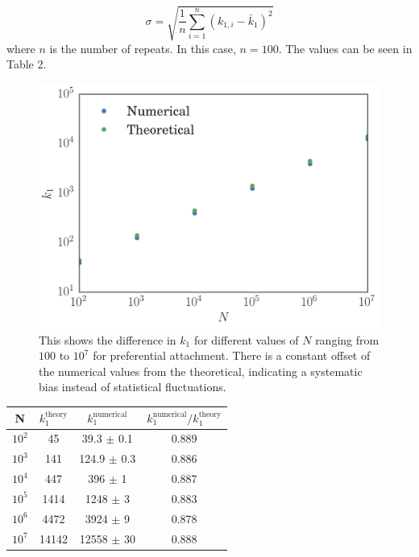 \begin{equation}
	\sigma = \sqrt{\frac{1}{n} \sum_{i=1}^n (k_{1, i} - \bar{k}_1)^2}
	\label{eq:population-std}
\end{equation}
where $n$ is the number of repeats. In this case, $n = 100$. The values can be seen in Table 2. 


\begin{figure}
    \centering
    \includegraphics[height=0.5\linewidth]{img/pa-numerical-theoretical-k1}
    \caption{This shows the difference in $k_1$ for different values of $N$ ranging from $100$ to $10^7$ for preferential attachment. There is a constant offset of the numerical values from the theoretical, indicating a systematic bias instead of statistical fluctuations. }
    \label{fig:pa-numerical-theoretical-k1}
\end{figure}

\begin{center}
\begin{tabular}{ ||c | c | c | c ||}
\hline
N & $k_1^{\text{theory}}$ & $k_1^{\text{numerical}}$ & $k_1^{\text{numerical}} / k_1^{\text{theory}} $\\ 
\hline
$10^2$ & 45    & 39.3  $\pm$ 0.1 & 0.889 \\  
$10^3$ & 141   & 124.9 $\pm$ 0.3 & 0.886 \\
$10^4$ & 447   & 396   $\pm$  1  & 0.887 \\
$10^5$ & 1414  & 1248  $\pm$  3  & 0.883 \\
$10^6$ & 4472  & 3924  $\pm$  9  & 0.878 \\
$10^7$ & 14142 & 12558 $\pm$ 30  & 0.888 \\  
\hline
\end{tabular}
\label{table:pa-numerical-theoretical-ratio}
\end{center}


